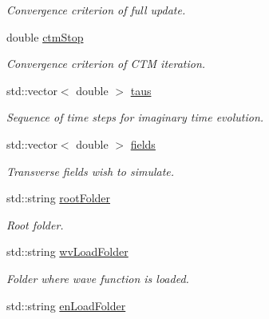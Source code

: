 \begin{DoxyCompactItemize}
\begin{DoxyCompactList}\small\item\em Convergence criterion of full update. \end{DoxyCompactList}\item 
double \hyperlink{structparaIpeps_a4e3892fec54bbae1464f10b8bd16e9ee}{ctm\+Stop}\hypertarget{structparaIpeps_a4e3892fec54bbae1464f10b8bd16e9ee}{}\label{structparaIpeps_a4e3892fec54bbae1464f10b8bd16e9ee}

\begin{DoxyCompactList}\small\item\em Convergence criterion of C\+TM iteration. \end{DoxyCompactList}\item 
std\+::vector$<$ double $>$ \hyperlink{structparaIpeps_a6410e48ca8df7249537ce8c7465363ae}{taus}\hypertarget{structparaIpeps_a6410e48ca8df7249537ce8c7465363ae}{}\label{structparaIpeps_a6410e48ca8df7249537ce8c7465363ae}

\begin{DoxyCompactList}\small\item\em Sequence of time steps for imaginary time evolution. \end{DoxyCompactList}\item 
std\+::vector$<$ double $>$ \hyperlink{structparaIpeps_a89523932c52a348268dedee2953ab024}{fields}\hypertarget{structparaIpeps_a89523932c52a348268dedee2953ab024}{}\label{structparaIpeps_a89523932c52a348268dedee2953ab024}

\begin{DoxyCompactList}\small\item\em Transverse fields wish to simulate. \end{DoxyCompactList}\item 
std\+::string \hyperlink{structparaIpeps_adcbb06f1509a3c0ee2d24d49bbb1b8f4}{root\+Folder}\hypertarget{structparaIpeps_adcbb06f1509a3c0ee2d24d49bbb1b8f4}{}\label{structparaIpeps_adcbb06f1509a3c0ee2d24d49bbb1b8f4}

\begin{DoxyCompactList}\small\item\em Root folder. \end{DoxyCompactList}\item 
std\+::string \hyperlink{structparaIpeps_ab7253ad31aba834a68142e7cda920ffc}{wv\+Load\+Folder}\hypertarget{structparaIpeps_ab7253ad31aba834a68142e7cda920ffc}{}\label{structparaIpeps_ab7253ad31aba834a68142e7cda920ffc}

\begin{DoxyCompactList}\small\item\em Folder where wave function is loaded. \end{DoxyCompactList}\item 
std\+::string \hyperlink{structparaIpeps_aaf3dbdf3e8524bac31d7da0aa2b2c1e7}{en\+Load\+Folder}\hypertarget{structparaIpeps_aaf3dbdf3e8524bac31d7da0aa2b2c1e7}{}\label{structparaIpeps_aaf3dbdf3e8524bac31d7da0aa2b2c1e7}


\end{DoxyCompactItemize}
